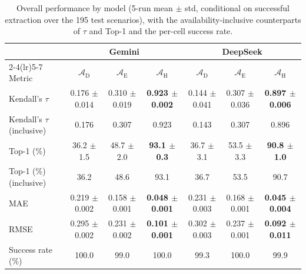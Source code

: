 \documentclass[11pt]{article}
\begin{document}
\begin{table}[htbp]
\centering
\footnotesize
\centering
\caption{Overall performance by model (5-run mean $\pm$ std, conditional on successful extraction over the 195 test scenarios), with the availability-inclusive counterparts of $\tau$ and Top-1 and the per-cell success rate.}
\label{tab:overall_by_model}
\renewcommand{\arraystretch}{1.10}
\begin{tabular}{lcccccc}
\toprule
 & \multicolumn{3}{c}{Gemini} & \multicolumn{3}{c}{DeepSeek} \\
\cmidrule(lr){2-4}\cmidrule(lr){5-7}
Metric & $\mathcal{A}_{\text{D}}$ & $\mathcal{A}_{\text{E}}$ & $\mathcal{A}_{\text{H}}$ & $\mathcal{A}_{\text{D}}$ & $\mathcal{A}_{\text{E}}$ & $\mathcal{A}_{\text{H}}$ \\
\midrule
Kendall's $\tau$ & 0.176 $\pm$ 0.014 & 0.310 $\pm$ 0.019 & \textbf{0.923 $\pm$ 0.002} & 0.144 $\pm$ 0.041 & 0.307 $\pm$ 0.036 & \textbf{0.897 $\pm$ 0.006} \\
Kendall's $\tau$ (inclusive) & 0.176 & 0.307 & 0.923 & 0.143 & 0.307 & 0.896 \\
Top-1 (\%) & 36.2 $\pm$ 1.5 & 48.7 $\pm$ 2.0 & \textbf{93.1 $\pm$ 0.3} & 36.7 $\pm$ 3.1 & 53.5 $\pm$ 3.3 & \textbf{90.8 $\pm$ 1.0} \\
Top-1 (\%) (inclusive) & 36.2 & 48.6 & 93.1 & 36.7 & 53.5 & 90.7 \\
MAE & 0.219 $\pm$ 0.002 & 0.158 $\pm$ 0.001 & \textbf{0.048 $\pm$ 0.001} & 0.231 $\pm$ 0.003 & 0.168 $\pm$ 0.001 & \textbf{0.045 $\pm$ 0.004} \\
RMSE & 0.295 $\pm$ 0.002 & 0.231 $\pm$ 0.002 & \textbf{0.101 $\pm$ 0.001} & 0.302 $\pm$ 0.003 & 0.237 $\pm$ 0.001 & \textbf{0.092 $\pm$ 0.011} \\
Success rate (\%) & 100.0 & 99.0 & 100.0 & 99.3 & 100.0 & 99.9 \\
\bottomrule
\end{tabular}

\medskip


\end{table}
\end{document}
